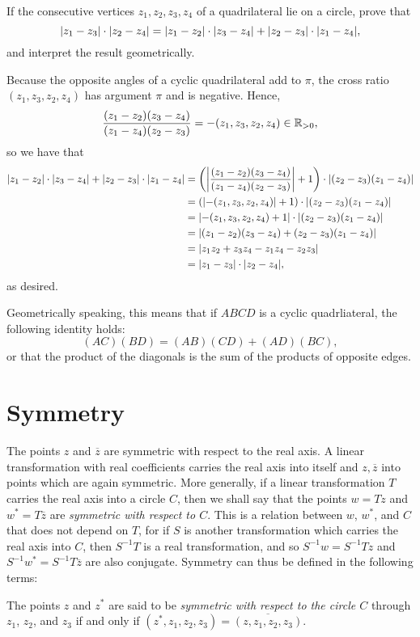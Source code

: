 \begin{exercise}
	If the consecutive vertices $z_1,z_2,z_3,z_4$ of a quadrilateral lie on a circle, prove that $$\lvert z_1-z_3 \rvert \cdot \lvert z_2-z_4 \rvert=\lvert z_1-z_2 \rvert \cdot \lvert z_3-z_4 \rvert+\lvert z_2-z_3 \rvert \cdot \lvert z_1-z_4 \rvert,$$ and interpret the result geometrically.
	
	\begin{sol}
		Because the opposite angles of a cyclic quadrilateral add to $\pi$, the cross ratio $(z_1,z_3,z_2,z_4)$ has argument $\pi$ and is negative. Hence, $$\dfrac{(z_1-z_2)(z_3-z_4)}{(z_1-z_4)(z_2-z_3)}=-(z_1,z_3,z_2,z_4) \in \mathbb R_{>0},$$ so we have that
		\begin{align*}
			\lvert z_1-z_2 \rvert \cdot \lvert z_3-z_4 \rvert+\lvert z_2-z_3 \rvert \cdot \lvert z_1-z_4 \rvert &=\left(\left\lvert \dfrac{(z_1-z_2)(z_3-z_4)}{(z_1-z_4)(z_2-z_3)}\right \rvert+1\right)\cdot \lvert (z_2-z_3)(z_1-z_4) \rvert \\
			&=\left(\lvert -(z_1,z_3,z_2,z_4) \rvert+1\right) \cdot \lvert (z_2-z_3)(z_1-z_4) \rvert \\
			&=\left\lvert -(z_1,z_3,z_2,z_4)+1\right \rvert \cdot \lvert (z_2-z_3)(z_1-z_4) \rvert \\
			&=\lvert (z_1-z_2)(z_3-z_4)+(z_2-z_3)(z_1-z_4) \rvert \\
			&=\lvert z_1z_2+z_3z_4-z_1z_4-z_2z_3 \rvert \\
			&=\lvert z_1-z_3 \rvert \cdot \lvert z_2-z_4 \rvert,
		\end{align*}
		as desired.
		
		Geometrically speaking, this means that if $ABCD$ is a cyclic quadrliateral, the following identity holds: $$(AC)(BD)=(AB)(CD)+(AD)(BC),$$ or that the product of the diagonals is the sum of the products of opposite edges.
	\end{sol}
\end{exercise}

\section{Symmetry}
The points $z$ and $\overline{z}$ are symmetric with respect to the real axis. A linear transformation with real coefficients carries the real axis into itself and $z,\overline{z}$ into points which are again symmetric. More generally, if a linear transformation $T$ carries the real axis into a circle $C$, then we shall say that the points $w=Tz$ and $w^*=T\overline{z}$ are \textit{symmetric with respect to $C$}. This is a relation between $w$, $w^*$, and $C$ that does not depend on $T$, for if $S$ is another transformation which carries the real axis into $C$, then $S^{-1}T$ is a real transformation, and so $S^{-1}w=S^{-1}Tz$ and $S^{-1}w^*=S^{-1}T\overline{z}$ are also conjugate. Symmetry can thus be defined in the following terms:
\begin{definition}
	The points $z$ and $z^*$ are said to be \emph{symmetric with respect to the circle $C$} through $z_1$, $z_2$, and $z_3$ if and only if $(z^*,z_1,z_2,z_3)=\overline{(z,z_1,z_2,z_3)}$.
\end{definition}

